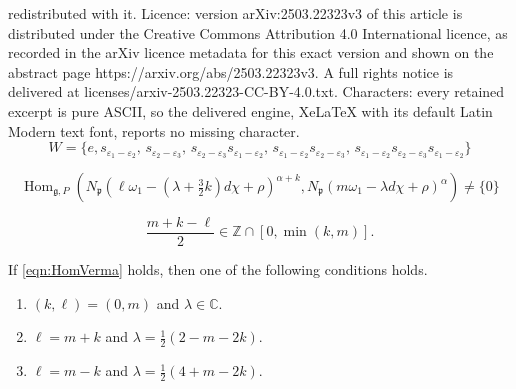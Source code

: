 \documentclass[10pt,a4paper]{amsart}
\newcommand{\C}{\mathbb{C}}
\newcommand{\Hom}{\operatorname{Hom}}
\newcommand{\Z}{\mathbb{Z}}
\newcommand{\eps}{\varepsilon}
\newcommand{\fg}{{\mathfrak g}}
\newcommand{\fp}{{\mathfrak p}}
\newcommand{\ga}{\alpha}
\begin{document}
redistributed with it. Licence: version arXiv:2503.22323v3 of this article is distributed under the Creative Commons Attribution 4.0 International licence, as recorded in the arXiv licence metadata for this exact version and shown on the abstract page https://arxiv.org/abs/2503.22323v3. A full rights notice is delivered at licenses/arxiv-2503.22323-CC-BY-4.0.txt. Characters: every retained excerpt is pure ASCII, so the delivered engine, XeLaTeX with its default Latin Modern text font, reports no missing character.
\begin{equation}\label{eqn:Weyl}
W = \{e, 
s_{\eps_1-\eps_2}, \,
s_{\eps_2-\eps_3}, \,
s_{\eps_2-\eps_3}s_{\eps_1-\eps_2}, \,
s_{\eps_1-\eps_2}s_{\eps_2-\eps_3}, \,
s_{\eps_1-\eps_2}s_{\eps_2-\eps_3}s_{\eps_1-\eps_2}\}
\end{equation}

\begin{equation}\label{eqn:HomVerma}
\Hom_{\fg,P}
(N_\fp(\ell\omega_1 -(\lambda +\tfrac{3}{2}k)d\chi+\rho)^{\ga+k},
N_\fp(m\omega_1 -\lambda d\chi+\rho)^\ga)
\neq \{0\}
\end{equation}

\begin{equation}\label{eqn:cond}
\frac{m+k-\ell}{2} \in \Z\cap [0,\min(k,m)].
\end{equation}

\begin{prop}\label{prop:Verma}
If \eqref{eqn:HomVerma} holds, then one of the following conditions holds.
\begin{enumerate}
\item[\emph{(a)}] $(k, \ell) = (0, m)$ and $\lambda \in \C$.
\item[\emph{(b)}] 
$\ell = m+k$ and $\lambda = \tfrac{1}{2}(2-m-2k)$.%
\item[\emph{(c)}] 
$\ell=m-k$ and $\lambda = \tfrac{1}{2}(4+m-2k)$.%
\end{enumerate}
\end{prop}
\end{document}
